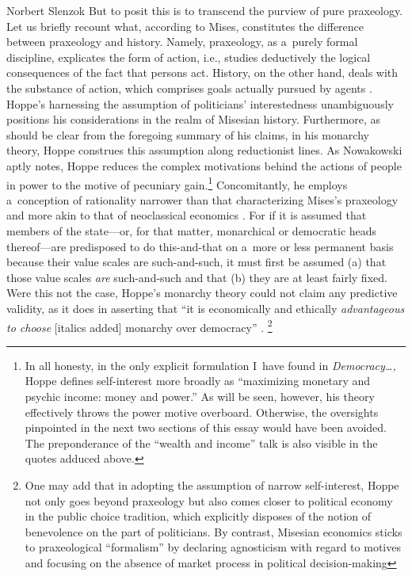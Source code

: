 \begin{artengenv}{Norbert Slenzok}
But to posit this is to transcend the purview of pure praxeology. Let us briefly recount what, according to Mises, constitutes the difference between praxeology and history. Namely, praxeology, as a~purely formal discipline, explicates the form of action, i.e., studies deductively the logical consequences of the fact that persons act. History, on the other hand, deals with the substance of action, which comprises goals actually pursued by agents 
\parencite[][p.271]{mises_theory_2007}. %
 Hoppe's harnessing the assumption of politicians' interestedness unambiguously positions his considerations in the realm of Misesian history. Furthermore, as should be clear from the foregoing summary of his claims, in his monarchy theory, Hoppe construes this assumption along reductionist lines. As Nowakowski 
\parencite*[][p.272]{nowakowski_dlaczego_2010} %
 aptly notes, Hoppe reduces the complex motivations behind the actions of people in power to the motive of pecuniary gain.\footnote{In all honesty, in the only explicit formulation I~have found in \textit{Democracy…,} Hoppe 
\parencite*[][p.144]{hoppe_democracy_2007} %
 defines self-interest more broadly as ``maximizing monetary and psychic income: money and power.'' As will be seen, however, his theory effectively throws the power motive overboard. Otherwise, the oversights pinpointed in the next two sections of this essay would have been avoided. The preponderance of the ``wealth and income'' talk is also visible in the quotes adduced above. } Concomitantly, he employs a~conception of rationality narrower than that characterizing Mises's praxeology and more akin to that of neoclassical economics 
\parencites[see][]{long_realism_2006}[][]{coyne_problem_2015}. %
 For if it is assumed that members of the state---or, for that matter, monarchical or democratic heads thereof---are predisposed to do this-and-that on a~more or less permanent basis because their value scales are such-and-such, it must first be assumed (a) that those value scales \textit{are} such-and-such and that (b) they are at least fairly fixed. Were this not the case, Hoppe's monarchy theory could not claim any predictive validity, as it does in asserting that ``it is economically and ethically \textit{advantageous to choose} [italics added] monarchy over democracy'' 
\parencite[][p.xx]{hoppe_democracy_2007}.%
\footnote{One may add that in adopting the assumption of narrow self-interest, Hoppe not only goes beyond praxeology but also comes closer to political economy in the public choice tradition, which explicitly disposes of the notion of benevolence on the part of politicians. By contrast, Misesian economics sticks to praxeological ``formalism'' by declaring agnosticism with regard to motives and focusing on the absence of market process in political decision-making 
}
\end{artengenv}
